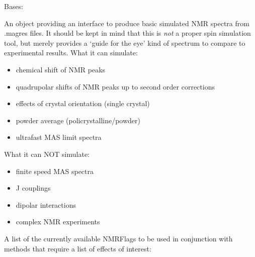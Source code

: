 \documentclass[letterpaper,10pt,english]{sphinxmanual}
\begin{document}
\begin{fulllineitems}
\label{doctree/soprano.calculate.nmr.nmr:soprano.calculate.nmr.nmr.NMRCalculator}
Bases: 

An object providing an interface to produce basic simulated NMR spectra
from .magres files. It should be kept in mind that this is \emph{not} a proper
spin simulation tool, but merely provides a `guide for the eye' kind of
spectrum to compare to experimental results. What it can simulate:
\begin{itemize}
\item {} 
chemical shift of NMR peaks

\item {} 
quadrupolar shifts of NMR peaks up to second order corrections

\item {} 
effects of crystal orientation (single crystal)

\item {} 
powder average (policrystalline/powder)

\item {} 
ultrafast MAS limit spectra

\end{itemize}

What it can NOT simulate:
\begin{itemize}
\item {} 
finite speed MAS spectra

\item {} 
J couplings

\item {} 
dipolar interactions

\item {} 
complex NMR experiments

\end{itemize}

A list of the currently available NMRFlags to be used in conjunction with
methods that require a list of effects of interest:


\end{fulllineitems}
\end{document}

